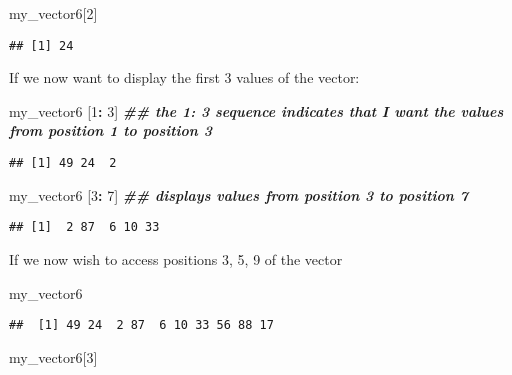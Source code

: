 \documentclass[
]{article}
\newenvironment{Shaded}{\begin{snugshade}}{\end{snugshade}}
\newcommand{\DecValTok}[1]{\textcolor[rgb]{0.00,0.00,0.81}{#1}}
\newcommand{\DocumentationTok}[1]{\textcolor[rgb]{0.56,0.35,0.01}{\textbf{\textit{#1}}}}
\newcommand{\NormalTok}[1]{#1}
\newcommand{\SpecialCharTok}[1]{\textcolor[rgb]{0.81,0.36,0.00}{\textbf{#1}}}
\begin{document}
\begin{Shaded}
\begin{Highlighting}[]
\NormalTok{my\_vector6[}\DecValTok{2}\NormalTok{]}
\end{Highlighting}
\end{Shaded}

\begin{verbatim}
## [1] 24
\end{verbatim}

If we now want to display the first 3 values of the vector:

\begin{Shaded}
\begin{Highlighting}[]
\NormalTok{my\_vector6 [}\DecValTok{1}\SpecialCharTok{:} \DecValTok{3}\NormalTok{] }\DocumentationTok{\#\# the 1: 3 sequence indicates that I want the values from position 1 to position 3}
\end{Highlighting}
\end{Shaded}

\begin{verbatim}
## [1] 49 24  2
\end{verbatim}

\begin{Shaded}
\begin{Highlighting}[]
\NormalTok{my\_vector6 [}\DecValTok{3}\SpecialCharTok{:} \DecValTok{7}\NormalTok{] }\DocumentationTok{\#\# displays values from position 3 to position 7}
\end{Highlighting}
\end{Shaded}

\begin{verbatim}
## [1]  2 87  6 10 33
\end{verbatim}

If we now wish to access positions 3, 5, 9 of the vector

\begin{Shaded}
\begin{Highlighting}[]
\NormalTok{my\_vector6}
\end{Highlighting}
\end{Shaded}

\begin{verbatim}
##  [1] 49 24  2 87  6 10 33 56 88 17
\end{verbatim}

\begin{Shaded}
\begin{Highlighting}[]
\NormalTok{my\_vector6[}\DecValTok{3}\NormalTok{]}
\end{Highlighting}
\end{Shaded}
\end{document}
